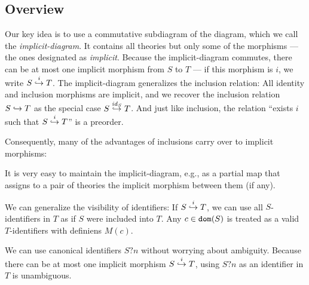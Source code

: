 \subsection{Overview}

Our key idea is to use a commutative subdiagram of the \mmt diagram, which we call the \emph{implicit-diagram}.
It contains all theories but only some of the morphisms --- the ones designated as \emph{implicit}.
Because the implicit-diagram commutes, there can be at most one implicit morphism from $S$ to $T$ --- if this morphism is $i$, we write $\ipc{i}{S}{T}$.
The implicit-diagram generalizes the inclusion relation:
All identity and inclusion morphisms are implicit, and we recover the inclusion relation $S\harr T$ as the special case $\ipc{\id{S}}{S}{T}$.
And just like inclusion, the relation ``exists $i$ such that $\ipc{i}{S}{T}$'' is a preorder.

Consequently, many of the advantages of inclusions carry over to implicit morphisms:
\begin{compactitem}
\item It is very easy to maintain the implicit-diagram, e.g., as a partial map that assigns to a pair of theories the implicit morphism between them (if any).
\item We can generalize the visibility of identifiers: If $\ipc{i}{S}{T}$, we can use all $S$-identifiers in $T$ as if $S$ were included into $T$.
Any $c\in\dom{S}$ is treated as a valid $T$-identifiers with definiens $M(c)$.
\item We can use canonical identifiers $S?n$ without worrying about ambiguity. Because there can be at most one implicit morphism $\ipc{i}{S}{T}$, using $S?n$ as an identifier in $T$ is unambiguous.
\end{compactitem}


